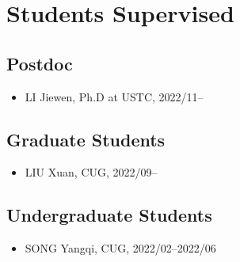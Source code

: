 \section{Students Supervised}

\subsection{Postdoc}
\begin{itemize}
\item LI Jiewen, Ph.D at USTC, 2022/11--
\end{itemize}

\subsection{Graduate Students}
\begin{itemize}
\item LIU Xuan, CUG, 2022/09--
\end{itemize}

\subsection{Undergraduate Students}
\begin{itemize}
\item SONG Yangqi, CUG, 2022/02--2022/06
\end{itemize}
